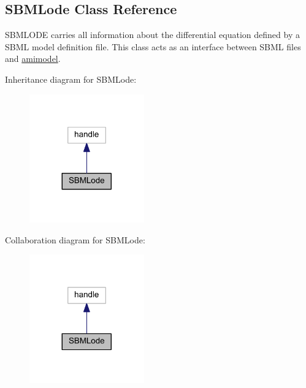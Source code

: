 \hypertarget{class_s_b_m_lode}{}\subsection{S\+B\+M\+Lode Class Reference}
\label{class_s_b_m_lode}


S\+B\+M\+L\+O\+D\+E carries all information about the differential equation defined by a S\+B\+M\+L model definition file. This class acts as an interface between S\+B\+M\+L files and \hyperlink{classamimodel}{amimodel}.  




Inheritance diagram for S\+B\+M\+Lode\+:\nopagebreak
\begin{figure}[H]
\begin{center}
\leavevmode
\includegraphics[width=140pt]{class_s_b_m_lode__inherit__graph}
\end{center}
\end{figure}


Collaboration diagram for S\+B\+M\+Lode\+:\nopagebreak
\begin{figure}[H]
\begin{center}
\leavevmode
\includegraphics[width=140pt]{class_s_b_m_lode__coll__graph}
\end{center}
\end{figure}

